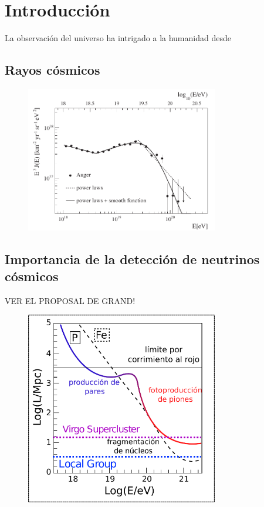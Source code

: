 \chapter{Introducci\'on}
\label{ch:intro}

La observaci\'on del universo ha intrigado a la humanidad desde 

\section{Rayos c\'osmicos}


	\begin{figure}[ht]
		\begin{center}
		\includegraphics[width=0.75\textwidth]{fig/introduccion/spectrum_withGZK}
		\caption{\label{fig:specGZK} }
		\end{center}
	\end{figure}
	
	\section{Importancia de la detecci\'on de neutrinos c\'osmicos}

	VER EL PROPOSAL DE GRAND!
	
\begin{figure}[ht]
	\begin{center}
	\includegraphics[width=0.75\textwidth]{fig/introduccion/proton_propaga_espanol}
	\caption{\label{fig:protProp} }
	\end{center}
\end{figure}


